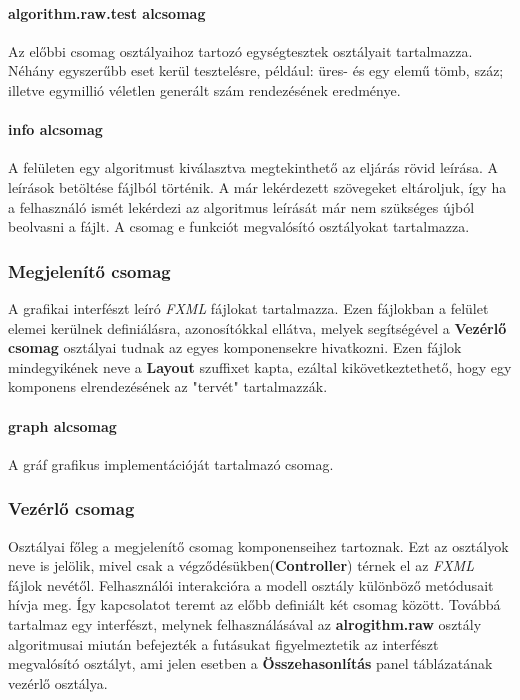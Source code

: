 \documentclass{elteikthesis}
\begin{document}
\paragraph{algorithm.raw.test alcsomag}
Az előbbi csomag osztályaihoz tartozó egységtesztek osztályait tartalmazza. Néhány egyszerűbb eset kerül tesztelésre, például: üres- és egy elemű tömb, száz; illetve egymillió véletlen generált szám rendezésének eredménye.
\paragraph{info alcsomag}
A felületen egy algoritmust kiválasztva megtekinthető az eljárás rövid leírása. A leírások betöltése fájlból történik. A már lekérdezett szövegeket eltároljuk, így ha a felhasználó ismét lekérdezi az algoritmus leírását már nem szükséges újból beolvasni a fájlt. A csomag e funkciót megvalósító osztályokat tartalmazza.

\subsubsection{Megjelenítő csomag}
A grafikai interfészt leíró \emph{FXML} fájlokat tartalmazza. Ezen fájlokban a felület elemei kerülnek definiálásra, azonosítókkal ellátva, melyek segítségével a \textbf{Vezérlő csomag} osztályai tudnak az egyes komponensekre hivatkozni. Ezen fájlok mindegyikének neve a \textbf{Layout} szuffixet kapta, ezáltal kikövetkeztethető, hogy egy komponens elrendezésének az "tervét" tartalmazzák.\par
\paragraph{graph alcsomag}
A gráf grafikus implementációját tartalmazó csomag.

\subsubsection{Vezérlő csomag}
Osztályai főleg a megjelenítő csomag komponenseihez tartoznak. Ezt az osztályok neve is jelölik, mivel csak a végződésükben(\textbf{Controller}) térnek el az \emph{FXML} fájlok nevétől. Felhasználói interakcióra a modell osztály különböző metódusait hívja meg. Így kapcsolatot teremt az előbb definiált két csomag között. Továbbá tartalmaz egy interfészt, melynek felhasználásával az \textbf{alrogithm.raw} osztály algoritmusai miután befejezték a futásukat figyelmeztetik az interfészt megvalósító osztályt, ami jelen esetben a \textbf{Összehasonlítás} panel táblázatának vezérlő osztálya.
\end{document}
